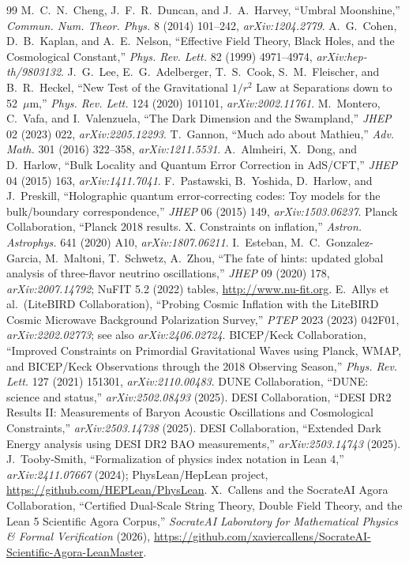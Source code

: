 \documentclass[11pt,a4paper]{article}
\theoremstyle{remark}
\begin{document}
\begin{thebibliography}{99}
 M.~C.~N.~Cheng, J.~F.~R.~Duncan, and J.~A.~Harvey, ``Umbral Moonshine,'' \textit{Commun. Num. Theor. Phys.} 8 (2014) 101--242, \textit{arXiv:1204.2779}.
 A.~G.~Cohen, D.~B.~Kaplan, and A.~E.~Nelson, ``Effective Field Theory, Black Holes, and the Cosmological Constant,'' \textit{Phys. Rev. Lett.} 82 (1999) 4971--4974, \textit{arXiv:hep-th/9803132}.
 J.~G.~Lee, E.~G.~Adelberger, T.~S.~Cook, S.~M.~Fleischer, and B.~R.~Heckel, ``New Test of the Gravitational $1/r^2$ Law at Separations down to 52~$\mu$m,'' \textit{Phys. Rev. Lett.} 124 (2020) 101101, \textit{arXiv:2002.11761}.
 M.~Montero, C.~Vafa, and I.~Valenzuela, ``The Dark Dimension and the Swampland,'' \textit{JHEP} 02 (2023) 022, \textit{arXiv:2205.12293}.
 T.~Gannon, ``Much ado about Mathieu,'' \textit{Adv. Math.} 301 (2016) 322--358, \textit{arXiv:1211.5531}.
 A.~Almheiri, X.~Dong, and D.~Harlow, ``Bulk Locality and Quantum Error Correction in AdS/CFT,'' \textit{JHEP} 04 (2015) 163, \textit{arXiv:1411.7041}.
 F.~Pastawski, B.~Yoshida, D.~Harlow, and J.~Preskill, ``Holographic quantum error-correcting codes: Toy models for the bulk/boundary correspondence,'' \textit{JHEP} 06 (2015) 149, \textit{arXiv:1503.06237}.
 Planck Collaboration, ``Planck 2018 results. X. Constraints on inflation,'' \textit{Astron. Astrophys.} 641 (2020) A10, \textit{arXiv:1807.06211}.
 I.~Esteban, M.~C.~Gonzalez-Garcia, M.~Maltoni, T.~Schwetz, A.~Zhou, ``The fate of hints: updated global analysis of three-flavor neutrino oscillations,'' \textit{JHEP} 09 (2020) 178, \textit{arXiv:2007.14792}; NuFIT 5.2 (2022) tables, \url{http://www.nu-fit.org}.
 E.~Allys et al.\ (LiteBIRD Collaboration), ``Probing Cosmic Inflation with the LiteBIRD Cosmic Microwave Background Polarization Survey,'' \textit{PTEP} 2023 (2023) 042F01, \textit{arXiv:2202.02773}; see also \textit{arXiv:2406.02724}.
 BICEP/Keck Collaboration, ``Improved Constraints on Primordial Gravitational Waves using Planck, WMAP, and BICEP/Keck Observations through the 2018 Observing Season,'' \textit{Phys. Rev. Lett.} 127 (2021) 151301, \textit{arXiv:2110.00483}.
 DUNE Collaboration, ``DUNE: science and status,'' \textit{arXiv:2502.08493} (2025).
 DESI Collaboration, ``DESI DR2 Results II: Measurements of Baryon Acoustic Oscillations and Cosmological Constraints,'' \textit{arXiv:2503.14738} (2025).
 DESI Collaboration, ``Extended Dark Energy analysis using DESI DR2 BAO measurements,'' \textit{arXiv:2503.14743} (2025).
 J.~Tooby-Smith, ``Formalization of physics index notation in Lean 4,'' \textit{arXiv:2411.07667} (2024); PhysLean/HepLean project, \url{https://github.com/HEPLean/PhysLean}.
 X.~Callens and the SocrateAI Agora Collaboration, ``Certified Dual-Scale String Theory, Double Field Theory, and the Lean 5 Scientific Agora Corpus,'' \textit{SocrateAI Laboratory for Mathematical Physics \& Formal Verification} (2026), \url{https://github.com/xaviercallens/SocrateAI-Scientific-Agora-LeanMaster}.

\end{thebibliography}
\end{document}
